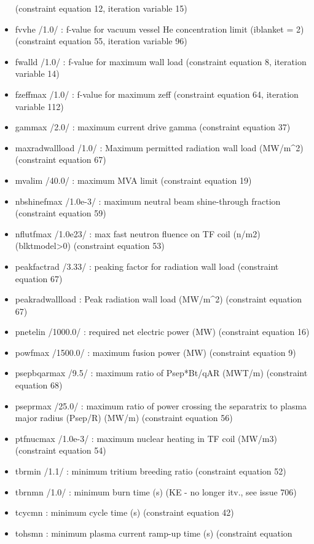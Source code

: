 \documentclass[]{article}
\begin{document}
\begin{itemize}
  (constraint equation 12, iteration variable 15)
\item
  fvvhe /1.0/ : f-value for vacuum vessel He concentration limit
  (iblanket = 2) (constraint equation 55, iteration variable 96)
\item
  fwalld /1.0/ : f-value for maximum wall load (constraint equation 8,
  iteration variable 14)
\item
  fzeffmax /1.0/ : f-value for maximum zeff (constraint equation 64,
  iteration variable 112)
\item
  gammax /2.0/ : maximum current drive gamma (constraint equation 37)
\item
  maxradwallload /1.0/ : Maximum permitted radiation wall load
  (MW/m\^{}2) (constraint equation 67)
\item
  mvalim /40.0/ : maximum MVA limit (constraint equation 19)
\item
  nbshinefmax /1.0e-3/ : maximum neutral beam shine-through fraction
  (constraint equation 59)
\item
  nflutfmax /1.0e23/ : max fast neutron fluence on TF coil (n/m2)
  (blktmodel\textgreater{}0) (constraint equation 53)
\item
  peakfactrad /3.33/ : peaking factor for radiation wall load
  (constraint equation 67)
\item
  peakradwallload : Peak radiation wall load (MW/m\^{}2) (constraint
  equation 67)
\item
  pnetelin /1000.0/ : required net electric power (MW) (constraint
  equation 16)
\item
  powfmax /1500.0/ : maximum fusion power (MW) (constraint equation 9)
\item
  psepbqarmax /9.5/ : maximum ratio of Psep*Bt/qAR (MWT/m) (constraint
  equation 68)
\item
  pseprmax /25.0/ : maximum ratio of power crossing the separatrix to
  plasma major radius (Psep/R) (MW/m) (constraint equation 56)
\item
  ptfnucmax /1.0e-3/ : maximum nuclear heating in TF coil (MW/m3)
  (constraint equation 54)
\item
  tbrmin /1.1/ : minimum tritium breeding ratio (constraint equation 52)
\item
  tbrnmn /1.0/ : minimum burn time (s) (KE - no longer itv., see issue
  706)
\item
  tcycmn : minimum cycle time (s) (constraint equation 42)
\item
  tohsmn : minimum plasma current ramp-up time (s) (constraint equation

\end{itemize}
\end{document}
